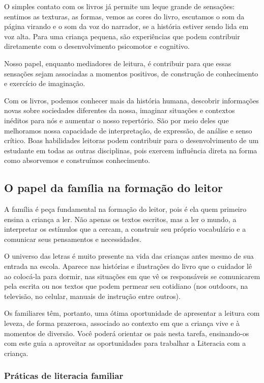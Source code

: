 \documentclass[11pt]{extarticle}
\begin{document}
O simples contato com os livros já permite um leque grande de sensações: 
sentimos as texturas, as formas, vemos as cores do livro, escutamos o som da página 
virando e o som da voz do narrador, se a história estiver sendo lida em voz alta. Para uma 
criança pequena, são experiências que podem contribuir diretamente com o desenvolvimento psicomotor 
e cognitivo. 

Nosso papel, enquanto mediadores de leitura, é contribuir para que essas 
sensações sejam associadas a momentos positivos, de construção de 
conhecimento e exercício de imaginação. 

Com os livros, podemos conhecer mais da história humana, descobrir informações 
novas sobre sociedades diferentes da nossa, imaginar situações e contextos inéditos 
para nós e aumentar o nosso repertório. São por meio deles que melhoramos nossa 
capacidade de interpretação, de expressão, de análise e senso crítico. Boas habilidades 
leitoras podem contribuir para o desenvolvimento de um estudante em todas as outras 
disciplinas, pois exercem influência direta na forma como absorvemos e 
construímos conhecimento.


\subsection{O papel da família na formação do leitor}
A família é peça fundamental na formação do leitor, pois é ela quem primeiro 
ensina a criança a ler. Não apenas os textos escritos, mas a ler o mundo, a 
interpretar os estímulos que a cercam, a construir seu próprio vocabulário e a 
comunicar seus pensamentos e necessidades.

O universo das letras é muito presente na vida das crianças antes mesmo de sua 
entrada na escola. Aparece nas histórias e ilustrações do livro que o cuidador 
lê ao colocá-la para dormir, nas situações em que vê os responsáveis se comunicarem 
pela escrita ou nos textos que podem permear seu cotidiano (nos outdoors, na 
televisão, no celular, manuais de instrução entre outros). 

Os familiares têm, 
portanto, uma ótima oportunidade de apresentar a leitura com leveza, de forma 
prazerosa, associado ao contexto em que a criança vive e à momentos de diversão. 
Você poderá orientar os pais nesta tarefa, ensinando-os com este guia a aproveitar 
as oportunidades para trabalhar a Literacia com a criança.


\subsubsection{Práticas de literacia familiar} 
\end{document}
